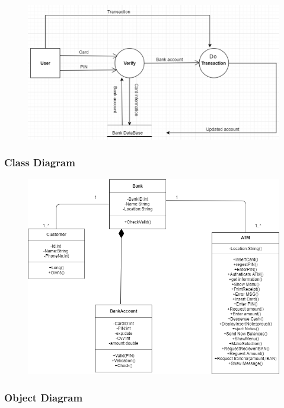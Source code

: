 \documentclass{article}
\begin{document}
		\begin{figure}[h!]
			\begin{center}
				\includegraphics[width=\linewidth]{img/dataflow.png}
			\end{center}
		\end{figure}	
	\newpage\subsubsection{Class Diagram}
		\begin{figure}[h!]
			\begin{center}
				\includegraphics[width=\linewidth]{img/class.png}
			\end{center}
		\end{figure}
	\newpage\subsubsection{Object Diagram}		
\end{document}
